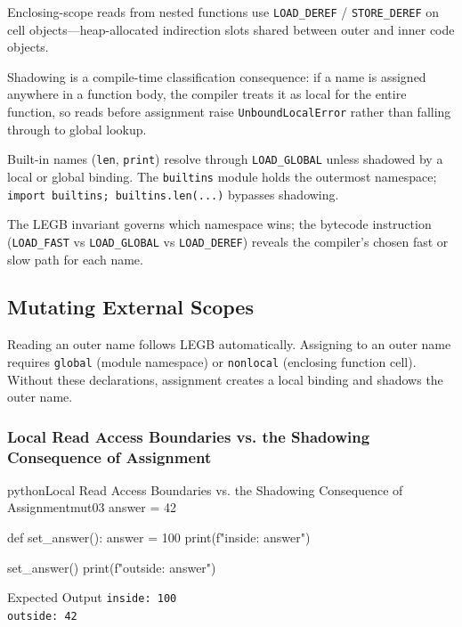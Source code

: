 \documentclass[a4paper,twoside]{report}
\begin{document}
Enclosing-scope reads from nested functions use \texttt{LOAD\_DEREF} / \texttt{STORE\_DEREF} on cell objects---heap-allocated indirection slots shared between outer and inner code objects.

Shadowing is a compile-time classification consequence: if a name is assigned anywhere in a function body, the compiler treats it as local for the entire function, so reads before assignment raise \texttt{UnboundLocalError} rather than falling through to global lookup.

Built-in names (\texttt{len}, \texttt{print}) resolve through \texttt{LOAD\_GLOBAL} unless shadowed by a local or global binding. The \texttt{builtins} module holds the outermost namespace; \texttt{import builtins; builtins.len(...)} bypasses shadowing.

The LEGB invariant governs which namespace wins; the bytecode instruction (\texttt{LOAD\_FAST} vs \texttt{LOAD\_GLOBAL} vs \texttt{LOAD\_DEREF}) reveals the compiler's chosen fast or slow path for each name.


\subsection{Mutating External Scopes}

Reading an outer name follows LEGB automatically. Assigning to an outer name requires \texttt{global} (module namespace) or \texttt{nonlocal} (enclosing function cell). Without these declarations, assignment creates a local binding and shadows the outer name.

\subsubsection{Local Read Access Boundaries vs. the Shadowing Consequence of Assignment}

\begin{codebox}[]{python}{Local Read Access Boundaries vs. the Shadowing Consequence of Assignment}{mut03}
answer = 42

def set_answer():
    answer = 100
    print(f"inside: {answer}")

set_answer()
print(f"outside: {answer}")
\end{codebox}


\begin{iobox}{Expected Output}
\texttt{inside: 100} \\
\texttt{outside: 42} \\
\end{iobox}
\end{document}
